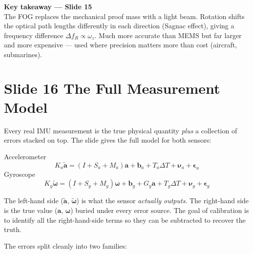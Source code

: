 \documentclass[12pt, a4paper]{article}
\begin{document}
\begin{keybox}
  \textbf{Key takeaway --- Slide 15}\\
  The FOG replaces the mechanical proof mass with a light beam.
  Rotation shifts the optical path lengths differently in each
  direction (Sagnac effect), giving a frequency difference
  $\Delta f_R \propto \omega_z$.
  Much more accurate than MEMS but far larger and more expensive ---
  used where precision matters more than cost (aircraft, submarines).
\end{keybox}

\clearpage
\section*{Slide 16 \quad The Full Measurement Model}


Every real IMU measurement is the true physical quantity \emph{plus}
a collection of errors stacked on top.
The slide gives the full model for both sensors:

Accelerometer
\[
  K_a\tilde{\mathbf{a}} = (I + S_a + M_a)\mathbf{a}
    + \mathbf{b}_a + T_a\Delta T + \boldsymbol{\nu}_a + \boldsymbol{\epsilon}_a
\]
Gyroscope
\[
  K_g\tilde{\boldsymbol{\omega}} = (I + S_g + M_g)\boldsymbol{\omega}
    + \mathbf{b}_g + G_g\mathbf{a} + T_g\Delta T
    + \boldsymbol{\nu}_g + \boldsymbol{\epsilon}_g
\]

The left-hand side ($\tilde{\mathbf{a}}$, $\tilde{\boldsymbol{\omega}}$)
is what the sensor \emph{actually outputs}.
The right-hand side is the true value ($\mathbf{a}$, $\boldsymbol{\omega}$)
buried under every error source.
The goal of calibration is to identify all the right-hand-side terms
so they can be subtracted to recover the truth.

The errors split cleanly into two families:
\end{document}
